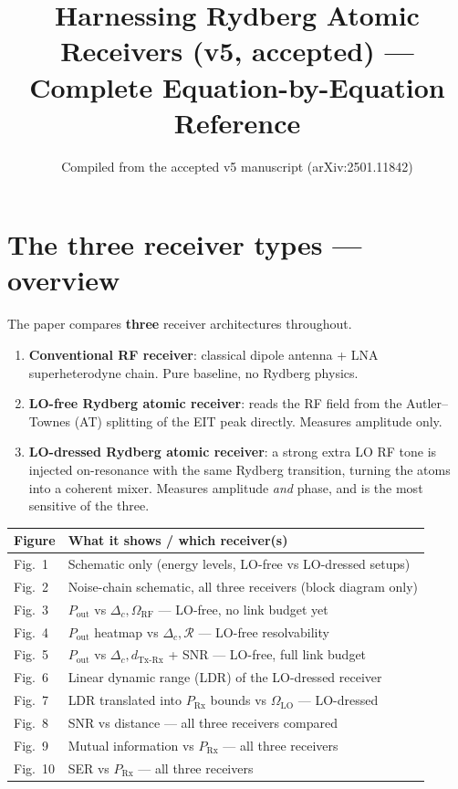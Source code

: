 \documentclass[11pt]{article}
\title{Harnessing Rydberg Atomic Receivers (v5, accepted) --- Complete Equation-by-Equation Reference}
\author{Compiled from the accepted v5 manuscript (arXiv:2501.11842)}
\date{}
\begin{document}
\maketitle
\tableofcontents

\section{The three receiver types --- overview}

The paper compares \textbf{three} receiver architectures throughout.
\begin{enumerate}
  \item \textbf{Conventional RF receiver}: classical dipole antenna + LNA
  superheterodyne chain. Pure baseline, no Rydberg physics.
  \item \textbf{LO-free Rydberg atomic receiver}: reads the RF field from
  the Autler--Townes (AT) splitting of the EIT peak directly. Measures
  amplitude only.
  \item \textbf{LO-dressed Rydberg atomic receiver}: a strong extra LO RF
  tone is injected on-resonance with the same Rydberg transition, turning
  the atoms into a coherent mixer. Measures amplitude \emph{and} phase,
  and is the most sensitive of the three.
\end{enumerate}

\begin{center}
\begin{tabular}{@{}ll@{}}
\toprule
Figure & What it shows / which receiver(s) \\
\midrule
Fig.~1 & Schematic only (energy levels, LO-free vs LO-dressed setups) \\
Fig.~2 & Noise-chain schematic, all three receivers (block diagram only) \\
Fig.~3 & $P_\text{out}$ vs $\Delta_c,\Omega_\text{RF}$ --- LO-free, no link budget yet \\
Fig.~4 & $P_\text{out}$ heatmap vs $\Delta_c,\mathcal{R}$ --- LO-free resolvability \\
Fig.~5 & $P_\text{out}$ vs $\Delta_c, d_\text{Tx-Rx}$ + SNR --- LO-free, full link budget \\
Fig.~6 & Linear dynamic range (LDR) of the LO-dressed receiver \\
Fig.~7 & LDR translated into $P_\text{Rx}$ bounds vs $\Omega_\text{LO}$ --- LO-dressed \\
Fig.~8 & SNR vs distance --- all three receivers compared \\
Fig.~9 & Mutual information vs $P_\text{Rx}$ --- all three receivers \\
Fig.~10 & SER vs $P_\text{Rx}$ --- all three receivers \\
\bottomrule
\end{tabular}
\end{center}
\end{document}
